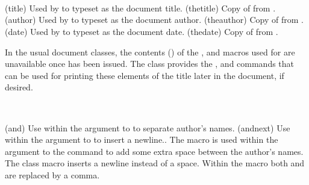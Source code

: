 
\begin{syntax}
\cmd{\title} \cmd{\thetitle} \\
\cmd{\author} \cmd{\theauthor} \\
\cmd{\date} \cmd{\thedate} \\
\end{syntax}
\glossary(title)
  {}%
  {Used by  to typeset  as the document  title.}
\glossary(thetitle)
  {}%
  {Copy of  from .}
\glossary(author)
  {}%
  {Used by  to typeset  as the document author.}
\glossary(theauthor)
  {}%
  {Copy of  from .}
\glossary(date)
  {}%
  {Used by  to typeset  as the document date.}
\glossary(thedate)
  {}%
  {Copy of  from .}

   In the usual document classes, the contents () of
the \cmd{\title}, \cmd{\author} and \cmd{\date}
macros used for \cmd{\maketitle} are unavailable once \cmd{\maketitle} 
has been
issued. The class provides the \cmd{\thetitle},
\cmd{\theauthor} and \cmd{\thedate} commands that can be used for printing
these elements of the title later in the document, 
if desired. 

\begin{syntax}
\cmd{\and} \cmd{\andnext} \\
\end{syntax}
\glossary(and)%
  {}%
  {Use within the argument to  to separate author's names.}
\glossary(andnext)%
  {}%
  {Use within the argument to  to insert a newline..}
   The macro \cmd{\and} is used within the argument to the
\cmd{\author} command to add some extra space between the author's names.
The class \cmd{\andnext} macro inserts a newline instead of a space.
Within the \cmd{\theauthor} macro both \cmd{\and} and \cmd{\andnext}
are replaced by a comma.

